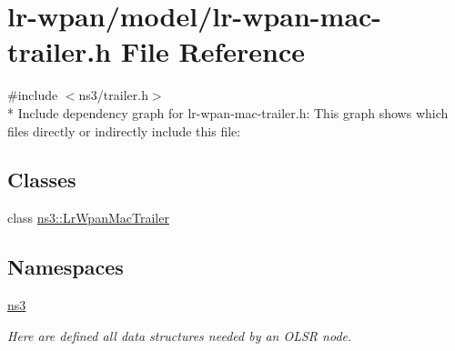 \hypertarget{lr-wpan-mac-trailer_8h}{}\section{lr-\/wpan/model/lr-\/wpan-\/mac-\/trailer.h File Reference}
\label{lr-wpan-mac-trailer_8h}
{\ttfamily \#include $<$ns3/trailer.\+h$>$}\\*
Include dependency graph for lr-\/wpan-\/mac-\/trailer.h\+:
This graph shows which files directly or indirectly include this file\+:
\subsection*{Classes}
\begin{DoxyCompactItemize}
\item 
class \hyperlink{classns3_1_1LrWpanMacTrailer}{ns3\+::\+Lr\+Wpan\+Mac\+Trailer}
\end{DoxyCompactItemize}
\subsection*{Namespaces}
\begin{DoxyCompactItemize}
\item 
 \hyperlink{namespacens3}{ns3}
\begin{DoxyCompactList}\small\item\em Here are defined all data structures needed by an O\+L\+SR node. \end{DoxyCompactList}\end{DoxyCompactItemize}
